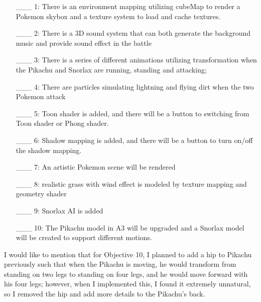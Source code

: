 \documentclass {article}
\begin{document}
\begin{enumerate}
     \item[\_\_\_ 1:]  There is an environment mapping utilizing cubeMap to render a Pokemon skybox and a texture system to load and cache textures.

     \item[\_\_\_ 2:]  There is a 3D sound system that can both generate the background music and provide sound effect in the battle

     \item[\_\_\_ 3:]  There is a series of different animations utilizing transformation when the Pikachu and Snorlax are running, standing and attacking;  

     \item[\_\_\_ 4:]  There are particles simulating lightning and flying dirt when the two Pokemon attack

     \item[\_\_\_ 5:]  Toon shader is added, and there will be a button to switching from Toon shader or Phong shader.

     \item[\_\_\_ 6:]  Shadow mapping is added, and there will be a button to turn on/off the shadow mapping.

     \item[\_\_\_ 7:]  An artistic Pokemon scene will be rendered

     \item[\_\_\_ 8:]  realistic grass with wind effect is modeled by texture mapping and geometry shader

     \item[\_\_\_ 9:]  Snorlax AI is added

     \item[\_\_\_ 10:]  The Pikachu model in A3 will be upgraded and a Snorlax model will be created to support different motions.
\end{enumerate}

I would like to mention that for Objective 10, I planned to add a hip to Pikachu previously such that when the Pikachu is moving, he would transform from standing on two legs to standing on four legs, and
he would move forward with his four legs; however, when I implemented this, I found it extremely unnatural, so I removed the hip and add more details to the Pikachu's back.

\end{document}
